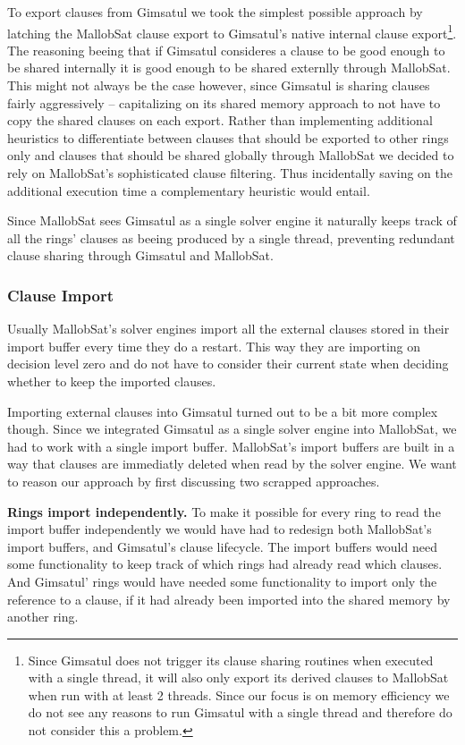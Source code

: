 \documentclass[12pt,a4paper,twoside]{scrartcl}
\numberwithin{equation}{section}
\begin{document}
To export clauses from Gimsatul we took the simplest possible approach by latching the MallobSat clause export to Gimsatul's native internal clause export\footnote{Since Gimsatul does not trigger its clause sharing routines when executed with a single thread, it will also only export its derived clauses to MallobSat when run with at least 2 threads. Since our focus is on memory efficiency we do not see any reasons to run Gimsatul with a single thread and therefore do not consider this a problem.}. The reasoning beeing that if Gimsatul consideres a clause to be good enough to be shared internally it is good enough to be shared externlly through MallobSat. This might not always be the case however, since Gimsatul is sharing clauses fairly aggressively -- capitalizing on its shared memory approach to not have to copy the shared clauses on each export. Rather than implementing additional heuristics to differentiate between clauses that should be exported to other rings only and clauses that should be shared globally through MallobSat we decided to rely on MallobSat's sophisticated clause filtering. Thus incidentally saving on the additional execution time a complementary heuristic would entail.

Since MallobSat sees Gimsatul as a single solver engine it naturally keeps track of all the rings' clauses as beeing produced by a single thread, preventing redundant clause sharing through Gimsatul and MallobSat.

\subsubsection{Clause Import}

Usually MallobSat's solver engines import all the external clauses stored in their import buffer every time they do a restart. This way they are importing on decision level zero and do not have to consider their current state when deciding whether to keep the imported clauses. 

Importing external clauses into Gimsatul turned out to be a bit more complex though. Since we integrated Gimsatul as a single solver engine into MallobSat, we had to work with a single import buffer. MallobSat's import buffers are built in a way that clauses are immediatly deleted when read by the solver engine. We want to reason our approach by first discussing two scrapped approaches.

\textbf{Rings import independently.} To make it possible for every ring to read the import buffer independently we would have had to redesign both MallobSat's import buffers, and Gimsatul's clause lifecycle. The import buffers would need some functionality to keep track of which rings had already read which clauses. And Gimsatul' rings would have needed some functionality to import only the reference to a clause, if it had already been imported into the shared memory by another ring. 
\end{document}

